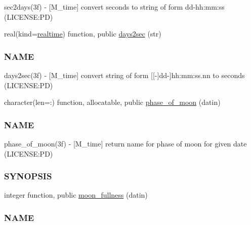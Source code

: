 \begin{DoxyCompactItemize}
\begin{DoxyCompactList}
sec2days(3f) -\/ \mbox{[}M\+\_\+time\mbox{]} convert seconds to string of form dd-\/hh\+:mm\+:ss (L\+I\+C\+E\+N\+SE\+:PD) \end{DoxyCompactList}\item 
real(kind=\mbox{\hyperlink{namespacem__time_ac10ea9e8d59ec74eaa7d89f2517d7422}{realtime}}) function, public \mbox{\hyperlink{namespacem__time_a99393c7906f1989f90ece03969224938}{days2sec}} (str)
\begin{DoxyCompactList}\small\item\em \subsubsection*{N\+A\+ME}

days2sec(3f) -\/ \mbox{[}M\+\_\+time\mbox{]} convert string of form \mbox{[}\mbox{[}-\/\mbox{]}dd-\/\mbox{]}hh\+:mm\+:ss.\+nn to seconds (L\+I\+C\+E\+N\+SE\+:PD) \end{DoxyCompactList}\item 
character(len=\+:) function, allocatable, public \mbox{\hyperlink{namespacem__time_ab8a976e2f113cc38b6df80974cee55dc}{phase\+\_\+of\+\_\+moon}} (datin)
\begin{DoxyCompactList}\small\item\em \subsubsection*{N\+A\+ME}

phase\+\_\+of\+\_\+moon(3f) -\/ \mbox{[}M\+\_\+time\mbox{]} return name for phase of moon for given date (L\+I\+C\+E\+N\+SE\+:PD) \subsubsection*{S\+Y\+N\+O\+P\+S\+IS}\end{DoxyCompactList}\item 
integer function, public \mbox{\hyperlink{namespacem__time_a702b39998a769b8f60070c0bec975ee2}{moon\+\_\+fullness}} (datin)
\begin{DoxyCompactList}\small\item\em \subsubsection*{N\+A\+ME}


\end{DoxyCompactList}
\end{DoxyCompactItemize}
